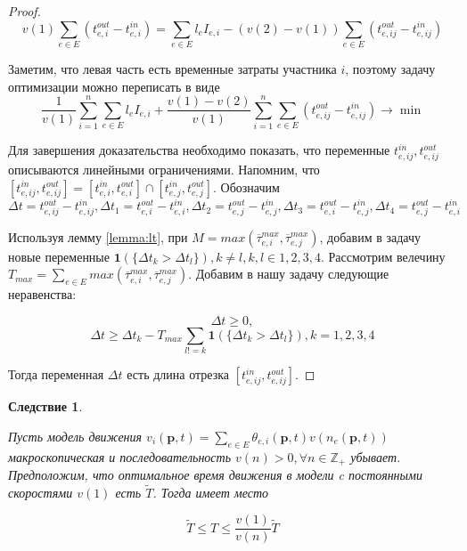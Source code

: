 \documentclass[12pt, a4paper]{article}
\DeclareMathOperator*{\minn}{min}
\newtheorem{corollary}{Следствие}[section]
\begin{document}
\begin{proof}
	$$v(1) \sum \limits _{e \in E} (t_{e, i}^{out} - t_{e, i}^{in}) = \sum \limits _{e \in E} l_e I_{e, i} - (v(2) - v(1)) \sum \limits _{e \in E} (t_{e, ij}^{out} - t_{e, ij}^{in})$$
	
	Заметим, что левая часть есть временные затраты участника $i$, поэтому задачу оптимизации можно переписать в виде
	$$ \frac{1}{v (1)} \sum\limits_{i = 1}^n \sum \limits _{e \in E} l_e I_{e, i} + \frac{v(1) - v(2)}{v (1)}  \sum\limits_{i = 1}^n \sum \limits _{e \in E} (t_{e, ij}^{out} - t_{e, ij}^{in}) \rightarrow \minn $$
	
	Для завершения доказательства необходимо показать, что переменные $t_{e, ij}^{in}, t_{e, ij}^{out}$ описываются линейными ограничениями. Напомним, что $[t_{e, ij}^{in}, t_{e, ij}^{out}] = [t_{e, i}^{in}, t_{e, i}^{out}] \cap [t_{e, j}^{in}, t_{e, j}^{out}]$. Обозначим $\Delta t = t_{e, ij}^{out} - t_{e, ij}^{in}, \Delta t_1 =  t_{e, i}^{out} - t_{e, i}^{in}, \Delta t_2 =  t_{e, j}^{out} - t_{e, j}^{in}, \Delta t_3 =  t_{e, i}^{out} - t_{e, j}^{in}, \Delta t_4 =  t_{e, j}^{out} - t_{e, i}^{in}$
	
	Используя лемму \ref{lemma:lt}, при $M = max (\overline{\tau}_{e, i}^{max}, \overline{\tau}_{e, j}^{max})$, добавим в задачу новые переменные $\textbf{1} (\{ \Delta t_k > \Delta t_l\}), k \ne l, k, l \in {1, 2, 3, 4}$. Рассмотрим велечину $T_{max} = \sum \limits_{e \in E} max (\overline{\tau}_{e, i}^{max}, \overline{\tau}_{e, j}^{max})$. Добавим в нашу задачу следующие неравенства: 
	
	$$\Delta t \ge 0, $$
	$$\Delta t \ge \Delta t_k - T_{max} \sum \limits_{l != k} {\textbf{1} (\{ \Delta t_k > \Delta t_l\})}, k = 1, 2, 3, 4$$
	
	Тогда переменная $\Delta t$ есть длина отрезка $[t_{e, ij}^{in}, t_{e, ij}^{out}]$. 
	
\end{proof}

\begin{corollary}
	\label{corollary:rel}

	Пусть модель движения $ v_i(\textbf{p}, t) = \sum \limits _{e \in E} \theta_{e, i} (\textbf{p}, t) v (n_e (\textbf{p}, t))$ макроскопическая и последовательность $v(n) > 0, \forall n \in \mathbb{Z}_+$ убывает. Предположим, что оптимальное время движения в модели c постоянными скоростями $v(1)$ есть $\widetilde{T}$. Тогда имеет место

	$$ \widetilde{T} \le T \le \frac {v(1)}{v(n)} \widetilde{T}$$
	
\end{corollary}
\end{document}
